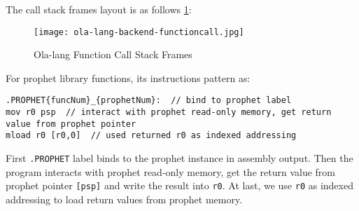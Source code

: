 The call stack frames layout is as follows \ref{fig:ola-lang-backend-functioncall}:

\begin{figure}[!htp]
    \centering
    \texttt{[image: ola-lang-backend-functioncall.jpg]}
    \caption{Ola-lang Function Call Stack Frames}
    \label{fig:ola-lang-backend-functioncall}
\end{figure}

For prophet library functions, its instructions pattern as:
\begin{lstlisting}[language={}]
.PROPHET{funcNum}_{prophetNum}:  // bind to prophet label
mov r0 psp  // interact with prophet read-only memory, get return value from prophet pointer
mload r0 [r0,0]  // used returned r0 as indexed addressing
\end{lstlisting}

First \texttt{.PROPHET} label binds to the prophet instance in assembly output.
Then the program interacts with prophet read-only memory, get the return value from prophet pointer \texttt{[psp]} and write the result into \texttt{r0}.
At last, we use \texttt{r0} as indexed addressing to load return values from prophet memory.
